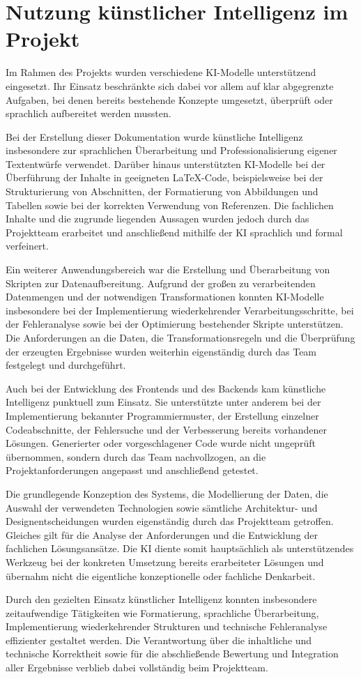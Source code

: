 \section{Nutzung künstlicher Intelligenz im Projekt}

Im Rahmen des Projekts wurden verschiedene KI-Modelle unterstützend eingesetzt. Ihr Einsatz beschränkte sich dabei vor allem auf klar abgegrenzte Aufgaben, bei denen bereits bestehende Konzepte umgesetzt, überprüft oder sprachlich aufbereitet werden mussten.

Bei der Erstellung dieser Dokumentation wurde künstliche Intelligenz insbesondere zur sprachlichen Überarbeitung und Professionalisierung eigener Textentwürfe verwendet. Darüber hinaus unterstützten KI-Modelle bei der Überführung der Inhalte in geeigneten LaTeX-Code, beispielsweise bei der Strukturierung von Abschnitten, der Formatierung von Abbildungen und Tabellen sowie bei der korrekten Verwendung von Referenzen. Die fachlichen Inhalte und die zugrunde liegenden Aussagen wurden jedoch durch das Projektteam erarbeitet und anschließend mithilfe der KI sprachlich und formal verfeinert.

Ein weiterer Anwendungsbereich war die Erstellung und Überarbeitung von Skripten zur Datenaufbereitung. Aufgrund der großen zu verarbeitenden Datenmengen und der notwendigen Transformationen konnten KI-Modelle insbesondere bei der Implementierung wiederkehrender Verarbeitungsschritte, bei der Fehleranalyse sowie bei der Optimierung bestehender Skripte unterstützen. Die Anforderungen an die Daten, die Transformationsregeln und die Überprüfung der erzeugten Ergebnisse wurden weiterhin eigenständig durch das Team festgelegt und durchgeführt.

Auch bei der Entwicklung des Frontends und des Backends kam künstliche Intelligenz punktuell zum Einsatz. Sie unterstützte unter anderem bei der Implementierung bekannter Programmiermuster, der Erstellung einzelner Codeabschnitte, der Fehlersuche und der Verbesserung bereits vorhandener Lösungen. Generierter oder vorgeschlagener Code wurde nicht ungeprüft übernommen, sondern durch das Team nachvollzogen, an die Projektanforderungen angepasst und anschließend getestet.

Die grundlegende Konzeption des Systems, die Modellierung der Daten, die Auswahl der verwendeten Technologien sowie sämtliche Architektur- und Designentscheidungen wurden eigenständig durch das Projektteam getroffen. Gleiches gilt für die Analyse der Anforderungen und die Entwicklung der fachlichen Lösungsansätze. Die KI diente somit hauptsächlich als unterstützendes Werkzeug bei der konkreten Umsetzung bereits erarbeiteter Lösungen und übernahm nicht die eigentliche konzeptionelle oder fachliche Denkarbeit.

Durch den gezielten Einsatz künstlicher Intelligenz konnten insbesondere zeitaufwendige Tätigkeiten wie Formatierung, sprachliche Überarbeitung, Implementierung wiederkehrender Strukturen und technische Fehleranalyse effizienter gestaltet werden. Die Verantwortung über die inhaltliche und technische Korrektheit sowie für die abschließende Bewertung und Integration aller Ergebnisse verblieb dabei vollständig beim Projektteam.